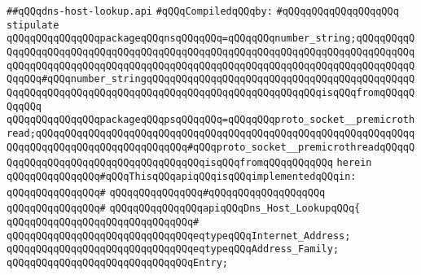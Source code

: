 \label{src/lib/std/src/socket/dns-host-lookup.api}
\verb|##qQQqdns-host-lookup.api|\newline
\newline
\verb|#qQQqCompiledqQQqby:|\newline
\verb|#qQQqqQQqqQQqqQQqqQQq|\newline
\newline
\newline
\verb|stipulate|\newline
\verb|qQQqqQQqqQQqqQQqpackageqQQqnsqQQqqQQq=qQQqqQQqnumber_string;qQQqqQQqqQQqqQQqqQQqqQQqqQQqqQQqqQQqqQQqqQQqqQQqqQQqqQQqqQQqqQQqqQQqqQQqqQQqqQQqqQQqqQQqqQQqqQQqqQQqqQQqqQQqqQQqqQQqqQQqqQQqqQQqqQQqqQQqqQQqqQQqqQQqqQQqqQQq#qQQqnumber_stringqQQqqQQqqQQqqQQqqQQqqQQqqQQqqQQqqQQqqQQqqQQqqQQqqQQqqQQqqQQqqQQqqQQqqQQqqQQqqQQqqQQqqQQqqQQqqQQqqQQqisqQQqfromqQQqqQQqqQQq|\newline
\verb|qQQqqQQqqQQqqQQqpackageqQQqpsqQQqqQQq=qQQqqQQqproto_socket__premicrothread;qQQqqQQqqQQqqQQqqQQqqQQqqQQqqQQqqQQqqQQqqQQqqQQqqQQqqQQqqQQqqQQqqQQqqQQqqQQqqQQqqQQqqQQqqQQqqQQq#qQQqproto_socket__premicrothreadqQQqqQQqqQQqqQQqqQQqqQQqqQQqqQQqqQQqqQQqisqQQqfromqQQqqQQqqQQq|\newline
\verb|herein|\newline
\newline
\verb|qQQqqQQqqQQqqQQq#qQQqThisqQQqapiqQQqisqQQqimplementedqQQqin:|\newline
\verb|qQQqqQQqqQQqqQQq#|\newline
\verb|qQQqqQQqqQQqqQQq#qQQqqQQqqQQqqQQqqQQq|\newline
\verb|qQQqqQQqqQQqqQQq#|\newline
\verb|qQQqqQQqqQQqqQQqapiqQQqDns_Host_LookupqQQq{|\newline
\verb|qQQqqQQqqQQqqQQqqQQqqQQqqQQqqQQq#|\newline
\verb|qQQqqQQqqQQqqQQqqQQqqQQqqQQqqQQqeqtypeqQQqInternet_Address;|\newline
\verb|qQQqqQQqqQQqqQQqqQQqqQQqqQQqqQQqeqtypeqQQqAddress_Family;|\newline
\newline
\verb|qQQqqQQqqQQqqQQqqQQqqQQqqQQqqQQqEntry;|\newline
